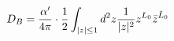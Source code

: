 \begin{equation}
 D_B = {{\alpha'} \over {4\pi}} \cdot {1 \over 2}
       \int_{|z| \le 1} d^2z {1 \over {|z|^2}}
       z^{L_0} {\bar z}^{{\tilde L}_0}
\end{equation}

